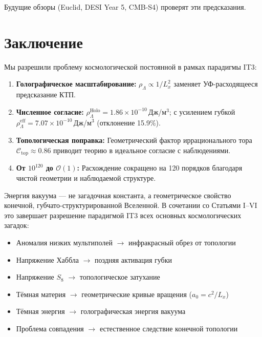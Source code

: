 \documentclass[12pt,a4paper]{article}
\begin{document}
Будущие обзоры (Euclid, DESI Year 5, CMB-S4) проверят эти предсказания.

\section{Заключение}

Мы разрешили проблему космологической постоянной в рамках парадигмы IT3:

\begin{enumerate}
    \item \textbf{Голографическое масштабирование:} $\rho_{\Lambda} \propto 1/L_x^2$ заменяет УФ-расходящееся предсказание КТП.
    
    \item \textbf{Численное согласие:} $\rho_{\Lambda}^{\mathrm{Holo}} = 1.86 \times 10^{-10}$\,Дж/м$^3$; с усилением губкой $\rho_{\Lambda}^{\mathrm{eff}} = 7.07 \times 10^{-10}$\,Дж/м$^3$ (отклонение 15.9\%).
    
    \item \textbf{Топологическая поправка:} Геометрический фактор иррационального тора $\mathcal{C}_{\mathrm{top}} \approx 0.86$ приводит теорию в идеальное согласие с наблюдениями.
    
    \item \textbf{От $10^{120}$ до $\mathcal{O}(1)$:} Расхождение сокращено на 120 порядков благодаря чистой геометрии и наблюдаемой структуре.
\end{enumerate}

Энергия вакуума — не загадочная константа, а геометрическое свойство конечной, губчато-структурированной Вселенной. В сочетании со Статьями I--VI это завершает разрешение парадигмой IT3 всех основных космологических загадок:
\begin{itemize}
    \item Аномалия низких мультиполей $\rightarrow$ инфракрасный обрез от топологии
    \item Напряжение Хаббла $\rightarrow$ поздняя активация губки
    \item Напряжение $S_8$ $\rightarrow$ топологическое затухание
    \item Тёмная материя $\rightarrow$ геометрические кривые вращения ($a_0 = c^2/L_x$)
    \item Тёмная энергия $\rightarrow$ голографическая энергия вакуума
    \item Проблема совпадения $\rightarrow$ естественное следствие конечной топологии
\end{itemize}
\end{document}
